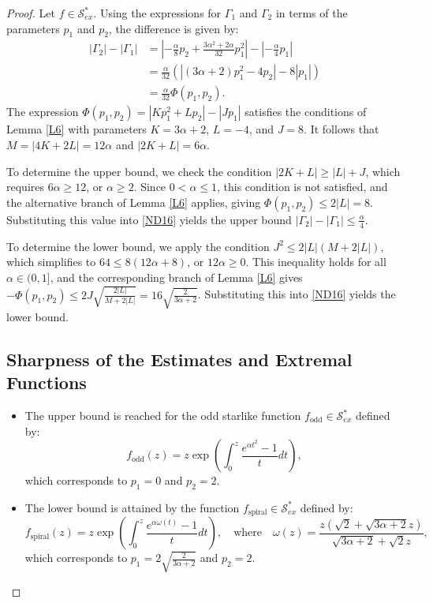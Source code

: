 \documentclass[11pt,reqno]{amsart}
\numberwithin{equation}{section}
\begin{document}
\begin{proof}
Let $f \in \mathcal{S}_{ex}^{\ast}$. Using the expressions for $\Gamma_1$ and $\Gamma_2$ in terms of the parameters $p_1$ and $p_2$, the difference is given by:
\begin{align}
|\Gamma_2| - |\Gamma_1|
&= \left| -\frac{\alpha}{8}p_2 + \frac{3\alpha^2+2\alpha}{32}p_1^2 \right| - \left| -\frac{\alpha}{4}p_1 \right| \nonumber \\
&= \frac{\alpha}{32}\left( |(3\alpha+2)p_1^2 - 4p_2| - 8|p_1| \right) \nonumber \\
&= \frac{\alpha}{32}\Phi(p_1, p_2).
\label{ND16}
\end{align}
The expression $\Phi(p_1, p_2) = |Kp_1^2 + Lp_2| - |Jp_1|$ satisfies the conditions of Lemma \ref{L6} with parameters $K = 3\alpha+2$, $L = -4$, and $J = 8$. It follows that $M = |4K + 2L| = 12\alpha$ and $|2K + L| = 6\alpha$.

To determine the upper bound, we check the condition $|2K + L| \ge |L| + J$, which requires $6\alpha \ge 12$, or $\alpha \ge 2$. Since $0 < \alpha \le 1$, this condition is not satisfied, and the alternative branch of Lemma \ref{L6} applies, giving $\Phi(p_1, p_2) \le 2|L| = 8$. Substituting this value into \eqref{ND16} yields the upper bound $|\Gamma_2| - |\Gamma_1| \le \frac{\alpha}{4}$.

To determine the lower bound, we apply the condition $J^2 \le 2|L|(M + 2|L|)$, which simplifies to $64 \le 8(12\alpha + 8)$, or $12\alpha \ge 0$. This inequality holds for all $\alpha \in (0,1]$, and the corresponding branch of Lemma \ref{L6} gives $-\Phi(p_1, p_2) \le 2J \sqrt{\frac{2|L|}{M + 2|L|}} = 16\sqrt{\frac{2}{3\alpha + 2}}$. Substituting this into \eqref{ND16} yields the lower bound.
\subsection*{Sharpness of the Estimates and Extremal Functions}
\begin{itemize}
\item The upper bound is reached for the odd starlike function $f_{\text{odd}} \in \mathcal{S}_{ex}^{\ast}$ defined by:
\[
f_{\text{odd}}(z) = z\exp\left(\int_0^z \frac{e^{\alpha t^2}-1}{t}dt\right),
\]
which corresponds to $p_1=0$ and $p_2=2$. 

\item The lower bound is attained by the function $f_{\text{spiral}} \in \mathcal{S}_{ex}^{\ast}$ defined by:
\[
f_{\text{spiral}}(z) = z\exp\left(\int_0^z \frac{e^{\alpha \omega(t)}-1}{t}dt\right), \quad \text{where} \quad \omega(z)=\frac{z\left(\sqrt{2}+\sqrt{3\alpha+2}z\right)}{\sqrt{3\alpha+2}+\sqrt{2}z},
\]
which corresponds to $p_1=2\sqrt{\frac{2}{3\alpha+2}}$ and $p_2=2$.
\end{itemize}
\end{proof}
\end{document}
